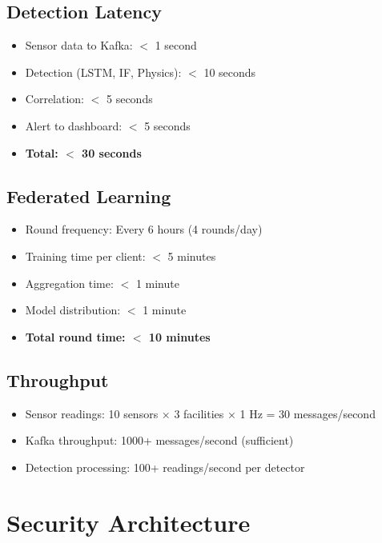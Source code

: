 \documentclass[12pt,a4paper]{article}
\begin{document}
\subsection{Detection Latency}

\begin{itemize}[leftmargin=1cm,itemsep=0pt]
    \item Sensor data to Kafka: $<$ 1 second
    \item Detection (LSTM, IF, Physics): $<$ 10 seconds
    \item Correlation: $<$ 5 seconds
    \item Alert to dashboard: $<$ 5 seconds
    \item \textbf{Total: $<$ 30 seconds}
\end{itemize}

\subsection{Federated Learning}

\begin{itemize}[leftmargin=1cm,itemsep=0pt]
    \item Round frequency: Every 6 hours (4 rounds/day)
    \item Training time per client: $<$ 5 minutes
    \item Aggregation time: $<$ 1 minute
    \item Model distribution: $<$ 1 minute
    \item \textbf{Total round time: $<$ 10 minutes}
\end{itemize}

\subsection{Throughput}

\begin{itemize}[leftmargin=1cm,itemsep=0pt]
    \item Sensor readings: 10 sensors × 3 facilities × 1 Hz = 30 messages/second
    \item Kafka throughput: 1000+ messages/second (sufficient)
    \item Detection processing: 100+ readings/second per detector
\end{itemize}

\section{Security Architecture}
\end{document}
